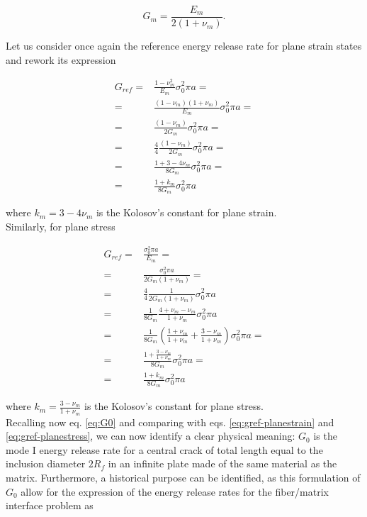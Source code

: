 \documentclass[a4paper]{jpconf}
\begin{document}
\begin{equation}
G_{m}=\frac{E_{m}}{2\left(1+\nu_{m}\right)}.
\end{equation}

Let us consider once again the reference energy release rate for plane strain states and rework its expression

\begin{equation}
\label{eq:gref-planestrain}
\begin{aligned}
G_{ref}=&\frac{1-\nu_{m}^{2}}{E_{m}}\sigma_{0}^{2}\pi a=\\
=&\frac{\left(1-\nu_{m}\right)\left(1+\nu_{m}\right)}{E_{m}}\sigma_{0}^{2}\pi a=\\
=&\frac{\left(1-\nu_{m}\right)}{2G_{m}}\sigma_{0}^{2}\pi a=\\
=&\frac{4}{4}\frac{\left(1-\nu_{m}\right)}{2G_{m}}\sigma_{0}^{2}\pi a=\\
=&\frac{1+3-4\nu_{m}}{8G_{m}}\sigma_{0}^{2}\pi a=\\
=&\frac{1+k_{m}}{8G_{m}}\sigma_{0}^{2}\pi a
\end{aligned}
\end{equation}

where $k_{m}=3-4\nu_{m}$ is the Kolosov's constant for plane strain.\\
Similarly, for plane stress

\begin{equation}
\label{eq:gref-planestress}
\begin{aligned}
G_{ref}=&\frac{\sigma_{0}^{2}\pi a}{E_{m}}=\\
=&\frac{\sigma_{0}^{2}\pi a}{2G_{m}\left(1+\nu_{m}\right)}=\\
=&\frac{4}{4}\frac{1}{2G_{m}\left(1+\nu_{m}\right)}\sigma_{0}^{2}\pi a\\
=&\frac{1}{8G_{m}}\frac{4+\nu_{m}-\nu_{m}}{1+\nu_{m}}\sigma_{0}^{2}\pi a\\
=&\frac{1}{8G_{m}}\left(\frac{1+\nu_{m}}{1+\nu_{m}}+\frac{3-\nu_{m}}{1+\nu_{m}}\right)\sigma_{0}^{2}\pi a=\\
=&\frac{1+\frac{3-\nu_{m}}{1+\nu_{m}}}{8G_{m}}\sigma_{0}^{2}\pi a=\\%
=&\frac{1+k_{m}}{8G_{m}}\sigma_{0}^{2}\pi a
\end{aligned}
\end{equation}

where $k_{m}=\frac{3-\nu_{m}}{1+\nu_{m}}$ is the Kolosov's constant for plane stress.\\
Recalling now eq. \ref{eq:G0} and comparing with eqs. \ref{eq:gref-planestrain} and \ref{eq:gref-planestress}, we can now identify a clear physical meaning: $G_{0}$ is the mode I energy release rate for a central crack of total length equal to the inclusion diameter $2R_{f}$ in an infinite plate made of the same material as the matrix. Furthermore, a historical purpose can be identified, as this formulation of $G_{0}$ allow for the expression of the energy release rates for the fiber/matrix interface problem as
\end{document}
